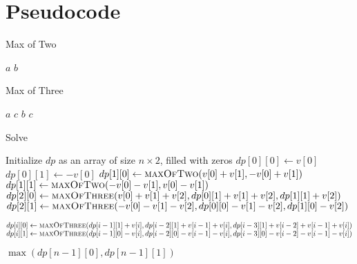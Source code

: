 \documentclass{article}
\begin{document}
\section{Pseudocode}
\begin{algorithm}
\caption{Max of Two}\label{maxoftwo}
\begin{algorithmic}[1]
        \State \Return $a$
    \Else
        \State \Return $b$
    \EndIf
\EndFunction
\end{algorithmic}
\end{algorithm}

\begin{algorithm}
\caption{Max of Three}\label{maxofthree}
\begin{algorithmic}[1]
            \State \Return $a$
        \Else
            \State \Return $c$
        \EndIf
    \Else
            \State \Return $b$
        \Else
            \State \Return $c$
        \EndIf
    \EndIf
\EndFunction
\end{algorithmic}
\end{algorithm}

\begin{algorithm}
\caption{Solve}\label{solve}
\begin{algorithmic}[1]
    \State Initialize $dp$ as an array of size $n \times 2$, filled with zeros
    \State $dp[0][0] \gets v[0]$
    \State $dp[0][1] \gets -v[0]$
    \State $dp[1][0] \gets \textsc{maxOfTwo}(v[0] + v[1], -v[0] + v[1])$
    \State $dp[1][1] \gets \textsc{maxOfTwo}(-v[0] - v[1], v[0] - v[1])$
    \State $dp[2][0] \gets \textsc{maxOfThree}(v[0] + v[1] + v[2], dp[0][1] + v[1] + v[2], dp[1][1] + v[2])$
    \State $dp[2][1] \gets \textsc{maxOfThree}(-v[0] - v[1] - v[2], dp[0][0] - v[1] - v[2], dp[1][0] - v[2])$
    
        \State $dp[i][0] \gets \textsc{maxOfThree}(dp[i - 1][1] + v[i], dp[i - 2][1] + v[i - 1] + v[i], dp[i - 3][1] + v[i - 2] + v[i - 1] + v[i])$
        \State $dp[i][1] \gets \textsc{maxOfThree}(dp[i - 1][0] - v[i], dp[i - 2][0] - v[i - 1] - v[i], dp[i - 3][0] - v[i - 2] - v[i - 1] - v[i])$
    \EndFor
    
    \State \Return $\max(dp[n - 1][0], dp[n - 1][1])$
\EndFunction
\end{algorithmic}
\end{algorithm}
\end{document}
